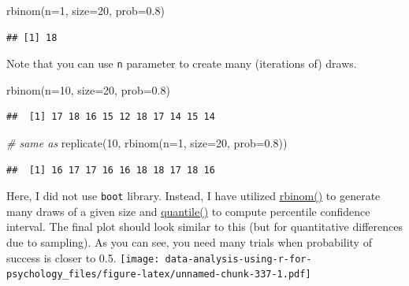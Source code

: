 \documentclass[
]{book}
\newenvironment{Shaded}{\begin{snugshade}}{\end{snugshade}}
\newcommand{\AttributeTok}[1]{\textcolor[rgb]{0.77,0.63,0.00}{#1}}
\newcommand{\CommentTok}[1]{\textcolor[rgb]{0.56,0.35,0.01}{\textit{#1}}}
\newcommand{\DecValTok}[1]{\textcolor[rgb]{0.00,0.00,0.81}{#1}}
\newcommand{\FloatTok}[1]{\textcolor[rgb]{0.00,0.00,0.81}{#1}}
\newcommand{\FunctionTok}[1]{\textcolor[rgb]{0.00,0.00,0.00}{#1}}
\newcommand{\NormalTok}[1]{#1}
\begin{document}
\begin{Shaded}
\begin{Highlighting}[]
\FunctionTok{rbinom}\NormalTok{(}\AttributeTok{n=}\DecValTok{1}\NormalTok{, }\AttributeTok{size=}\DecValTok{20}\NormalTok{, }\AttributeTok{prob=}\FloatTok{0.8}\NormalTok{)}
\end{Highlighting}
\end{Shaded}

\begin{verbatim}
## [1] 18
\end{verbatim}

Note that you can use \texttt{n} parameter to create many (iterations of) draws.

\begin{Shaded}
\begin{Highlighting}[]
\FunctionTok{rbinom}\NormalTok{(}\AttributeTok{n=}\DecValTok{10}\NormalTok{, }\AttributeTok{size=}\DecValTok{20}\NormalTok{, }\AttributeTok{prob=}\FloatTok{0.8}\NormalTok{)}
\end{Highlighting}
\end{Shaded}

\begin{verbatim}
##  [1] 17 18 16 15 12 18 17 14 15 14
\end{verbatim}

\begin{Shaded}
\begin{Highlighting}[]
\CommentTok{\# same as}
\FunctionTok{replicate}\NormalTok{(}\DecValTok{10}\NormalTok{, }\FunctionTok{rbinom}\NormalTok{(}\AttributeTok{n=}\DecValTok{1}\NormalTok{, }\AttributeTok{size=}\DecValTok{20}\NormalTok{, }\AttributeTok{prob=}\FloatTok{0.8}\NormalTok{))}
\end{Highlighting}
\end{Shaded}

\begin{verbatim}
##  [1] 16 17 17 16 16 18 18 17 18 16
\end{verbatim}

Here, I did not use \texttt{boot} library. Instead, I have utilized \href{https://stat.ethz.ch/R-manual/R-devel/library/stats/html/Binomial.html}{rbinom()} to generate many draws of a given size and \href{https://stat.ethz.ch/R-manual/R-devel/library/stats/html/quantile}{quantile()} to compute percentile confidence interval. The final plot should look similar to this (but for quantitative differences due to sampling). As you can see, you need many trials when probability of success is closer to 0.5.
\texttt{[image: data-analysis-using-r-for-psychology\_files/figure-latex/unnamed-chunk-337-1.pdf]}
\end{document}
